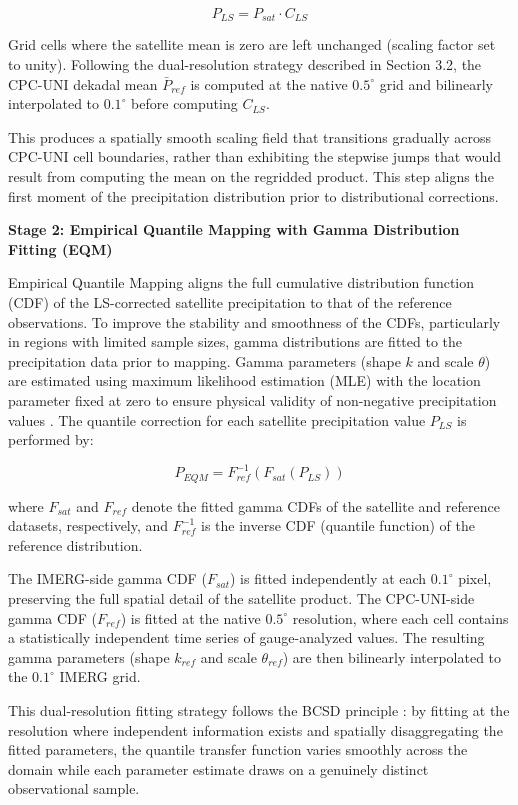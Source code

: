 \documentclass[remotesensing,article,submit,pdftex,moreauthors]{Definitions/mdpi}
\begin{document}
\[P_{LS} = P_{sat} \cdot C_{LS}\]

Grid cells where the satellite mean is zero are left unchanged (scaling
factor set to unity). Following the dual-resolution strategy described
in Section 3.2, the CPC-UNI dekadal mean \(\bar{P}_{ref}\) is computed
at the native \(0.5^{\circ}\) grid and bilinearly interpolated to
\(0.1^{\circ}\) before computing \(C_{LS}\).

This produces a spatially smooth scaling field that transitions
gradually across CPC-UNI cell boundaries, rather than exhibiting the
stepwise jumps that would result from computing the mean on the
regridded product. This step aligns the first moment of the
precipitation distribution prior to distributional corrections.

\textbf{Stage 2: Empirical Quantile Mapping with Gamma Distribution
Fitting (EQM)}

Empirical Quantile Mapping aligns the full cumulative distribution
function (CDF) of the LS-corrected satellite precipitation to that of
the reference observations. To improve the stability and smoothness of
the CDFs, particularly in regions with limited sample sizes, gamma
distributions are fitted to the precipitation data prior to mapping.
Gamma parameters (shape \(k\) and scale \(\theta\)) are estimated using
maximum likelihood estimation (MLE) with the location parameter fixed at
zero to ensure physical validity of non-negative precipitation values
\cite{ref15}. The quantile correction for each satellite precipitation value
\(P_{LS}\) is performed by:

\[P_{EQM} = F_{ref}^{-1}\left( F_{sat}\left( P_{LS} \right) \right)\]

where \(F_{sat}\) and \(F_{ref}\) denote the fitted gamma CDFs of the
satellite and reference datasets, respectively, and \(F_{ref}^{-1}\) is
the inverse CDF (quantile function) of the reference distribution.

The IMERG-side gamma CDF (\(F_{sat}\)) is fitted independently at each
\(0.1^{\circ}\) pixel, preserving the full spatial detail of the
satellite product. The CPC-UNI-side gamma CDF (\(F_{ref}\)) is fitted at
the native \(0.5^{\circ}\) resolution, where each cell contains a
statistically independent time series of gauge-analyzed values. The
resulting gamma parameters (shape \(k_{ref}\) and scale
\(\theta_{ref}\)) are then bilinearly interpolated to the
\(0.1^{\circ}\) IMERG grid.

This dual-resolution fitting strategy follows the BCSD principle
\cite{ref23}: by fitting at the resolution where independent information
exists and spatially disaggregating the fitted parameters, the quantile
transfer function varies smoothly across the domain while each parameter
estimate draws on a genuinely distinct observational sample.
\end{document}
